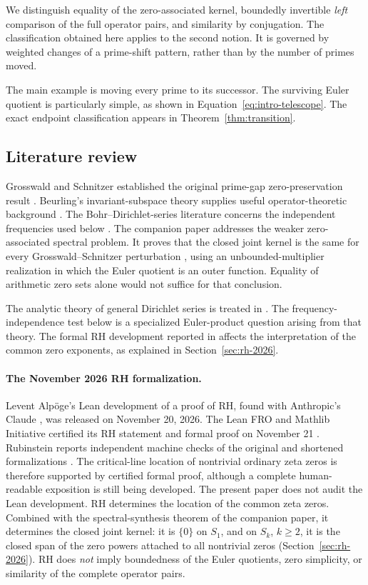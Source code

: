 \documentclass[12pt,letterpaper]{article}
\numberwithin{equation}{section}
\theoremstyle{remark}
\begin{document}
We distinguish equality of the zero-associated kernel,
boundedly invertible \emph{left} comparison of the full operator
pairs, and similarity by conjugation. The classification obtained
here applies to the second notion. It is governed by weighted
changes of a prime-shift pattern, rather than by the number
of primes moved.

The main example is moving every prime to its successor.
The surviving Euler quotient is particularly simple,
as shown in Equation~\eqref{eq:intro-telescope}.
The exact endpoint classification appears in
Theorem~\ref{thm:transition}.
\subsection{Literature review}
Grosswald and Schnitzer established the original prime-gap
zero-preservation result \cite{GS78}.  Beurling's invariant-subspace
theory supplies useful operator-theoretic background \cite{Be49}.
The Bohr--Dirichlet-series literature concerns the independent
frequencies used below \cite{DGMS19,Sc20}.
The companion paper \cite{GS26} addresses the weaker zero-associated
spectral problem.  It proves that the closed joint kernel is the same
for every Grosswald--Schnitzer perturbation
\cite[Theorem~2.1]{GS26}, using an unbounded-multiplier
realization in which the Euler quotient is an outer function.  Equality
of arithmetic zero sets alone would not suffice for that conclusion.

The analytic theory of general Dirichlet series is treated in
\cite{DGMS19,Sc20}. The frequency-independence test below is
a specialized Euler-product question arising from that theory.
The formal RH development reported in \cite{LF26,Ru26}
affects the interpretation of the common zero exponents,
as explained in Section~\ref{sec:rh-2026}.

\paragraph{The November 2026 RH formalization.}
Levent Alp\"oge's Lean development of a proof of RH, found with
Anthropic's Claude \cite{Ru26}, was released on
November 20, 2026. The Lean FRO and Mathlib Initiative certified
its RH statement and formal proof on November 21 \cite{LF26}.
Rubinstein reports independent machine checks of the original
and shortened formalizations \cite{Ru26}. The critical-line location
of nontrivial ordinary zeta zeros is therefore supported by certified
formal proof, although a complete human-readable exposition is still
being developed. The present paper does not audit the Lean development.
RH determines the location of the common zeta zeros.  Combined with
the spectral-synthesis theorem of the companion paper, it determines the
closed joint kernel: it is $\{0\}$ on $S_1$, and on $S_k$, $k\ge2$, it is the
closed span of the zero powers attached to all nontrivial zeros
(Section~\ref{sec:rh-2026}).  RH does \emph{not} imply boundedness of the
Euler quotients, zero simplicity, or similarity of the complete operator
pairs.
\end{document}
